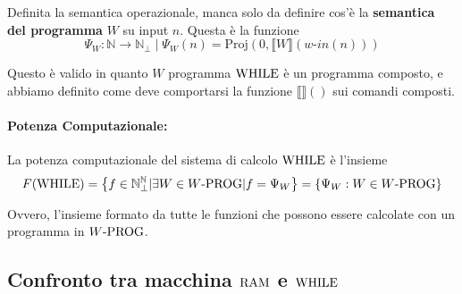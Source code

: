 Definita la semantica operazionale, manca solo da definire cos'è la \textbf{semantica del programma} $W$ su input $n$. Questa è la funzione 
$$ \Psi_W: \mathbb{N} \rightarrow \mathbb{N}_\bot \; | \; \Psi_W (n) = \text{Proj}\left(0, \llbracket W \rrbracket (w\text{-}in(n))\right)$$

Questo è valido in quanto $W$ programma $\text{WHILE}$ è un programma composto, e abbiamo definito come deve comportarsi la funzione $\llbracket \rrbracket ()$ sui comandi composti.\\

\paragraph{Potenza Computazionale:} La potenza computazionale del sistema di calcolo $\text{WHILE}$ è l'insieme 
$$ F(\text{WHILE}) = \left\{f \in \mathbb{N}^{\mathbb{N}}_\bot | \exists W \in W\text{-PROG} | f = \Psi_W \right\} = \left\{\Psi_W : W \in W\text{-PROG} \right\}$$

Ovvero, l'insieme formato da tutte le funzioni che possono essere calcolate con un programma in $W\text{-PROG}$.\\

\subsection{Confronto tra macchina $\text{RAM}$ e $\text{WHILE}$}




